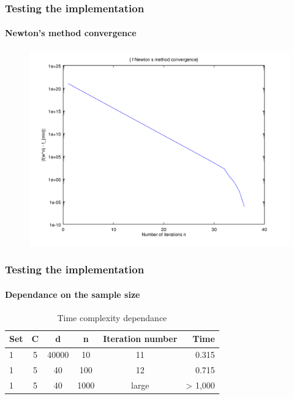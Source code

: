 \documentclass{beamer}
\begin{document}
\begin{frame}
\frametitle{Testing the implementation}
\framesubtitle{\textbf{Newton's method} convergence}


         \begin{figure}
         \centering
         \includegraphics[scale=0.4]{images/cvnewton4.png}
         \end{figure}

\end{frame}

\begin{frame}
\frametitle{Testing the implementation}
\framesubtitle{Dependance on the sample size}

         \begin{center}
                \begin{table}
                \caption{Time complexity dependance}
                \begin{tabular}{| l | c | c | c | c | r |}
                \hline
                Set & C & d & n & Iteration number & Time \\ \hline
                1 & 5 & 40000 & 10 & 11 & 0.315 \\ \hline
                1 & 5 & 40 & 100 & 12 & 0.715 \\ \hline
                1 & 5 & 40 & 1000 & large & > 1,000 \\ \hline
                \end{tabular}
                \end{table}
         \end{center}

\end{frame}
\end{document}
